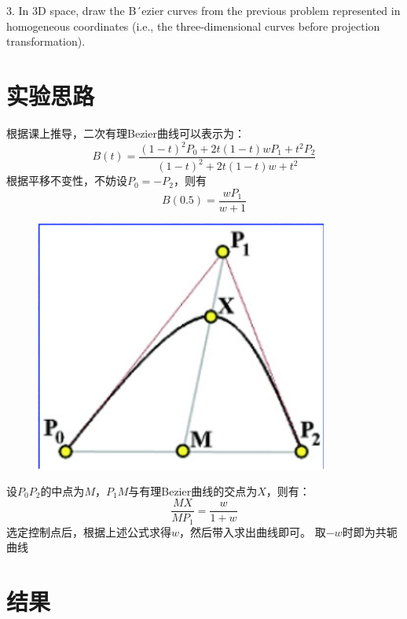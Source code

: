 \documentclass{article}
\begin{document}
	3. In 3D space, draw the B´ezier curves from the previous problem represented in homogeneous coordinates (i.e., the three-dimensional curves before projection transformation).
	
	\section*{实验思路}
	根据课上推导，二次有理Bezier曲线可以表示为：
	$$B(t)=\frac{(1-t)^2P_0+2t(1-t)wP_1+t^2P_2}{(1-t)^2+2t(1-t)w+t^2}$$
	根据平移不变性，不妨设$P_0=-P_2$，则有
	$$B(0.5)=\frac{wP_1}{w+1}$$
	\begin{figure}[H]
		\centering
		\includegraphics[scale=0.5]{idea}
		\label{fig:idea}
	\end{figure}
	设$P_0P_2$的中点为$M$，$P_1M$与有理Bezier曲线的交点为$X$，则有：
	$$\frac{MX}{MP_1}=\frac{w}{1+w}$$
	选定控制点后，根据上述公式求得$w$，然后带入求出曲线即可。
	取$-w$时即为共轭曲线
	\section*{结果}
\end{document}

